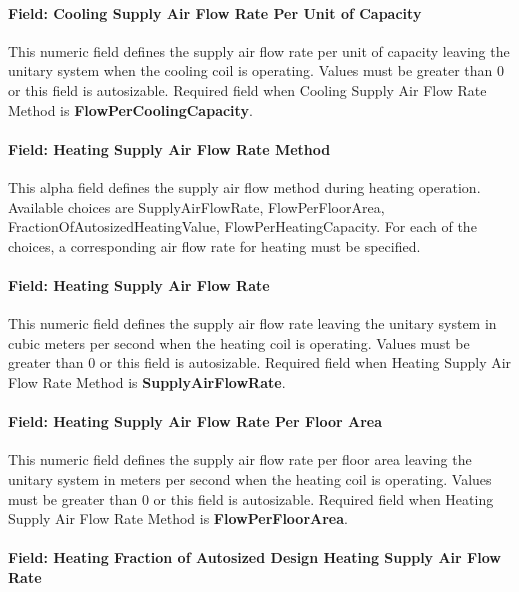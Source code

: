 \paragraph{Field: Cooling Supply Air Flow Rate Per Unit of Capacity}\label{field-cooling-supply-air-flow-rate-per-unit-of-capacity}

This numeric field defines the supply air flow rate per unit of capacity leaving the unitary system when the cooling coil is operating. Values must be greater than 0 or this field is autosizable. Required field when Cooling Supply Air Flow Rate Method is \textbf{FlowPerCoolingCapacity}.

\paragraph{Field: Heating Supply Air Flow Rate Method}\label{field-heating-supply-air-flow-rate-method-000}

This alpha field defines the supply air flow method during heating operation. Available choices are SupplyAirFlowRate, FlowPerFloorArea, FractionOfAutosizedHeatingValue, FlowPerHeatingCapacity. For each of the choices, a corresponding air flow rate for heating must be specified.

\paragraph{Field: Heating Supply Air Flow Rate}\label{field-heating-supply-air-flow-rate-001}

This numeric field defines the supply air flow rate leaving the unitary system in cubic meters per second when the heating coil is operating. Values must be greater than 0 or this field is autosizable. Required field when Heating Supply Air Flow Rate Method is \textbf{SupplyAirFlowRate}.

\paragraph{Field: Heating Supply Air Flow Rate Per Floor Area}\label{field-heating-supply-air-flow-rate-per-floor-area}

This numeric field defines the supply air flow rate per floor area leaving the unitary system in meters per second when the heating coil is operating. Values must be greater than 0 or this field is autosizable. Required field when Heating Supply Air Flow Rate Method is \textbf{FlowPerFloorArea}.

\paragraph{Field: Heating Fraction of Autosized Design Heating Supply Air Flow Rate}\label{field-heating-fraction-of-autosized-design-heating-supply-air-flow-rate}

